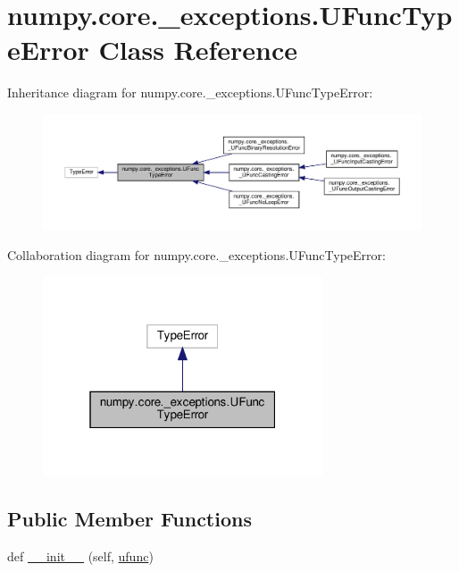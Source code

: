 \hypertarget{classnumpy_1_1core_1_1__exceptions_1_1UFuncTypeError}{}\section{numpy.\+core.\+\_\+exceptions.\+U\+Func\+Type\+Error Class Reference}
\label{classnumpy_1_1core_1_1__exceptions_1_1UFuncTypeError}


Inheritance diagram for numpy.\+core.\+\_\+exceptions.\+U\+Func\+Type\+Error\+:
\nopagebreak
\begin{figure}[H]
\begin{center}
\leavevmode
\includegraphics[width=350pt]{classnumpy_1_1core_1_1__exceptions_1_1UFuncTypeError__inherit__graph}
\end{center}
\end{figure}


Collaboration diagram for numpy.\+core.\+\_\+exceptions.\+U\+Func\+Type\+Error\+:
\nopagebreak
\begin{figure}[H]
\begin{center}
\leavevmode
\includegraphics[width=235pt]{classnumpy_1_1core_1_1__exceptions_1_1UFuncTypeError__coll__graph}
\end{center}
\end{figure}
\subsection*{Public Member Functions}
\begin{DoxyCompactItemize}
\item 
def \hyperlink{classnumpy_1_1core_1_1__exceptions_1_1UFuncTypeError_a8cef9be4675ddd4471b453818712d50b}{\+\_\+\+\_\+init\+\_\+\+\_\+} (self, \hyperlink{classnumpy_1_1core_1_1__exceptions_1_1UFuncTypeError_a10866e4bfc9971e5aa77e8cd1c9e04f4}{ufunc})
\end{DoxyCompactItemize}
